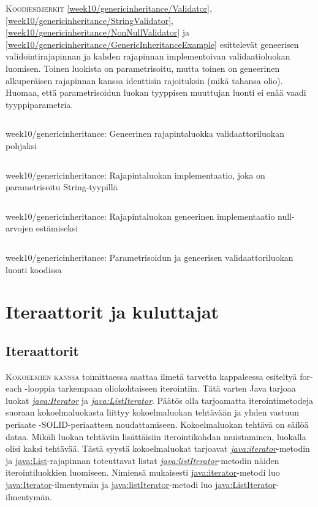 \documentclass[openany]{book}
\newcommand{\newthought}[1]{\smallskip\textsc{#1}}
\newcommand{\java}[1]{\underline{\gls{java:#1}}}
\newcommand{\newjava}[1]{\textit{\java{#1}}}
\newcommand{\code}[3]{
	\begin{listing}
		\linespread{0.85}
		\inputminted{java}{OhjelmointiopasEsimerkit/src/#1/#2.java}
		\caption{#1: #3}
		\label{#1/#2}
	\end{listing}
}
\begin{document}
\newthought{Koodiesimerkit} \ref{week10/genericinheritance/Validator},
\ref{week10/genericinheritance/StringValidator}, \ref{week10/genericinheritance/NonNullValidator}
ja \ref{week10/genericinheritance/GenericInheritanceExample} esittelevät geneerisen
validointirajapinnan ja kahden rajapinnan implementoivan validaatioluokan luomisen. Toinen
luokista on parametrisoitu, mutta toinen on geneerinen alkuperäisen rajapinnan kanssa identtisin
rajoituksin (mikä tahansa olio). Huomaa, että parametrisoidun luokan tyyppisen muuttujan luonti ei
enää vaadi tyyppiparametria.

\code{week10/genericinheritance}{Validator}{Geneerinen rajapintaluokka validaattoriluokan
pohjaksi}
\code{week10/genericinheritance}{StringValidator}{Rajapintaluokan implementaatio, joka on 
parametrisoitu String-tyypillä}
\code{week10/genericinheritance}{NonNullValidator}{Rajapintaluokan geneerinen implementaatio
null-arvojen estämiseksi}
\code{week10/genericinheritance}{GenericInheritanceExample}{Parametrisoidun ja geneerisen
validaattoriluokan luonti koodissa}


\section{Iteraattorit ja kuluttajat}
\label{iterators+consumers}

\subsection{Iteraattorit}
\label{iterators}

\newthought{Kokoelmien kanssa} toimittaessa saattaa ilmetä tarvetta kappaleessa 
esiteltyä for-each -looppia tarkempaan oliokohtaiseen iterointiin. Tätä varten Java tarjoaa luokat
\newjava{Iterator} ja \newjava{ListIterator}. Päätös olla tarjoamatta iterointimetodeja suoraan
kokoelmaluokasta liittyy kokoelmaluokan tehtävään ja \gls{yhden vastuun periaate}
-SOLID-periaatteen noudattamiseen. Kokoelmaluokan tehtävä on säilöä dataa. Mikäli luokan
tehtäviin lisättäisiin iterointikohdan muistaminen, luokalla olisi kaksi tehtävää. Tästä syystä
kokoelmaluokat tarjoavat \newjava{iterator}-metodin ja \java{List}-rajapinnan toteuttavat listat
\newjava{listIterator}-metodin näiden iterointiluokkien luomiseen. Nimiensä mukaisesti
\java{iterator}-metodi luo \java{Iterator}-ilmentymän ja \java{listIterator}-metodi luo
\java{ListIterator}-ilmentymän.
\end{document}
